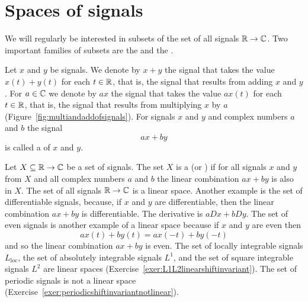 



\section{Spaces of signals}\label{sec:spaces-signals}

We will regularly be interested in subsets of the set of all signals ${\mathbb R} \to {\mathbb C}$.  Two important families of subsets are the  and the .

Let $x$ and $y$ be signals.  We denote by $x + y$ the signal that takes the value $x(t) + y(t)$ for each $t  \in {\mathbb R}$, that is, the signal that results from adding $x$ and $y$.  For $a \in {\mathbb C}$ we denote by $ax$ the signal that takes the value $a x(t)$ for each $t \in {\mathbb R}$, that is, the signal that results from multiplying $x$ by $a$ (Figure~\ref{fig:multiandaddofsignals}).  For signals $x$ and $y$ and complex numbers $a$ and $b$ the signal
\[
ax + by
\]
is called a  of $x$ and $y$.  %

Let $X \subseteq {\mathbb R} \to {\mathbb C}$ be a set of signals.  The set $X$ is a  (or ) if for all signals $x$ and $y$ from $X$ and all complex numbers $a$ and $b$ the linear combination $ax + by$ is also in $X$.  The set of all signals ${\mathbb R} \to {\mathbb C}$ is a linear space.  Another example is the set of differentiable signals, because, if $x$ and $y$ are differentiable, then the linear combination $ax + by$ is differentiable.  The derivative is $a D x + b D y$.  The set of even signals is another example of a linear space because if $x$ and $y$ are even then 
\[
ax(t) + by(t) = a x(-t) + b y(-t)
\]
and so the linear combination $ax + by$ is even.  The set of locally integrable signals $L_{\text{loc}}$, the set of absolutely integrable signals $L^1$, and the set of square integrable signals $L^2$ are linear spaces (Exercise~\ref{exer:L1L2linearshiftinvariant}).  The set of periodic signals is not a linear space (Exercise~\ref{exer:periodicshiftinvariantnotlinear}).

